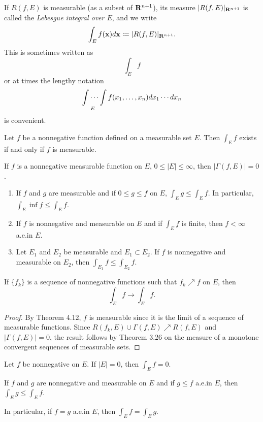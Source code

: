 If $R(f,E)$ is measurable (as a subset of $\mathbf{R}^{n+1}$), its measure
$|R(f,E)|_{\mathbf{R}^{n+1}}$ is called the \emph{Lebesgue integral over $E$},
and we write
\begin{equation}
\label{eq:lebesgue-integral}
\int_E f(\mathbf{x}) d \mathbf{x}\coloneqq|R(f,E)|_{\mathbf{R}^{n+1}}.
\end{equation}
This is sometimes written as
\[
\int_E f
\]
or at times the lengthy notation
\[
\idotsint\limits_{E} f(x_1,\dotsc,x_n) d  x_1\cdots d  x_n
\]
is convenient.
\begin{theorem*}[5.1]
Let $f$ be a nonnegative function defined on a measurable set $E$. Then
$\int_E f$ exists if and only if $f$ is measurable.
\end{theorem*}
\begin{lemma*}[5.3]
If $f$ is a nonnegative measurable function on $E$, $0\leq |E|\leq\infty$,
then $|\Gamma(f,E)|=0$.
\end{lemma*}
\begin{theorem*}[5.5]
\begin{enumerate}[label=\textnormal{(\roman*)}]
\item If $f$ and $g$ are measurable and if $0\leq g\leq f$ on $E$, $\int_E
  g\leq\int_E f$. In particular, $\int_E\inf f\leq\int_E f$.
\item If $f$ is nonnegative and measurable on $E$ and if $\int_E f$ is
  finite, then $f<\infty$ a.e.\@ in $E$.
\item Let $E_1$ and $E_2$ be measurable and $E_1\subset E_2$. If $f$ is
  nonnegative and measurable on $E_2$, then $\int_{E_1} f\leq\int_{E_2}f$.
\end{enumerate}
\end{theorem*}
\begin{theorem*}
If $\{f_k\}$ is a sequence of nonnegative functions such that $f_k\nearrow
f$ on $E$, then
\[
\int_E f\to\int_E f.
\]
\end{theorem*}
\begin{proof}
By Theorem 4.12, $f$ is measurable since it is the limit of a sequence of
measurable functions. Since $R(f_k,E)\cup\Gamma(f,E)\nearrow R(f,E)$ and
$|\Gamma(f,E)|=0$, the result follows by Theorem 3.26 on the measure of a
monotone convergent sequences of measurable sets.
\end{proof}
\begin{theorem*}[5.9]
Let $f$ be nonnegative on $E$. If $|E|=0$, then $\int_E f=0$.
\end{theorem*}
\begin{theorem*}[5.10]
If $f$ and $g$ are nonnegative and measurable on $E$ and if $g\leq f$
a.e.\@ in $E$, then $\int_E g\leq\int_E f$.

In particular, if $f=g$ a.e.\@ in $E$, then $\int_E f=\int_E g$.
\end{theorem*}
